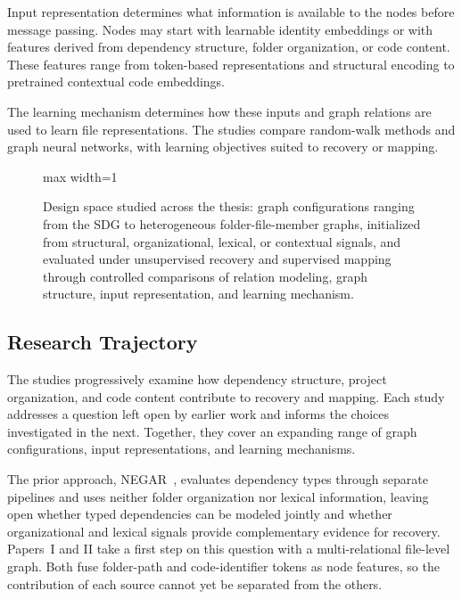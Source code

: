 Input representation determines what information is available to the nodes before message passing. Nodes may start with learnable identity embeddings or with features derived from dependency structure, folder organization, or code content. These features range from token-based representations and structural encoding to pretrained contextual code embeddings.
 
The learning mechanism determines how these inputs and graph relations are used to learn file representations. The studies compare random-walk methods and graph neural networks, with learning objectives suited to recovery or mapping.

\begin{figure}[!thb]
    \centering
    \begin{adjustbox}{max width=1\textwidth}
        
    \end{adjustbox}
\caption[Design space studied in the thesis.]{\fontsize{9.8}{12}\selectfont Design space studied across the thesis: graph configurations ranging from the SDG to heterogeneous folder-file-member graphs, initialized from structural, organizational, lexical, or contextual signals, and evaluated under unsupervised recovery and supervised mapping through controlled comparisons of relation modeling, graph structure, input representation, and learning mechanism. \label{fig:design_space}}
\end{figure}
 

\subsection{Research Trajectory \label{sec:research_trajectory}}

The studies progressively examine how dependency structure, project organization, and code content contribute to recovery and mapping. Each study addresses a question left open by earlier work and informs the choices investigated in the next. Together, they cover an expanding range of graph configurations, input representations, and learning mechanisms.
 
The prior approach, NEGAR~\cite{negar}, evaluates dependency types through separate pipelines and uses neither folder organization nor lexical information, leaving open whether typed dependencies can be modeled jointly and whether organizational and lexical signals provide complementary evidence for recovery. Papers~I and II take a first step on this question with a multi-relational file-level graph. Both fuse folder-path and code-identifier tokens as node features, so the contribution of each source cannot yet be separated from the others.

